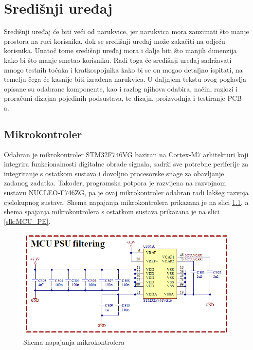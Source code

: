 \chapter{Središnji uređaj}
\label{pog:mainboard}

Središnji uređaj će biti veći od narukvice, jer narukvica mora zauzimati što manje prostora na ruci korisnika, dok se središnji uređaj može zakačiti na odjeću korisnika. Unatoč tome središnji uređaj mora i dalje biti što manjih dimenzija kako bi što manje smetao korisniku. Radi toga će središnji uređaj sadržavati mnogo testnih točaka i kratkospojnika kako bi se on mogao detaljno ispitati, na temelju čega će kasnije biti izrađena narukvica. U daljnjem tekstu ovog poglavlja opisane su odabrane komponente, kao i razlog njihova odabira, način, razlozi i proračuni dizajna pojedinih podsustava, te dizajn, proizvodnja i testiranje PCB-a.

\section{Mikrokontroler}
Odabran je mikrokontroler STM32F746VG baziran na Cortex-M7 arhitekturi koji integrira funkcionalnosti digitalne obrade signala, sadrži sve potrebne periferije za integriranje s ostatkom sustava i dovoljno procesorske snage za obavljanje zadanog zadatka. Također, programska potpora je razvijena na razvojnom sustavu NUCLEO-F746ZG, pa je ovaj mikrokontroler odabran radi lakšeg razvoja cjelokupnog sustava. Shema napajanja mikrokontrolera prikazana je na slici \ref{slk:MCU_PS}, a shema spajanja mikrokontrolera s ostatkom sustava prikazana je na slici \ref{slk:MCU_PE}.
\begin{figure}[!htb]
    \centering
    \includegraphics[width=10 cm]{Figures/MCU_02.png}
    \caption{Shema napajanja mikrokontrolera}
    \label{slk:MCU_PS}
\end{figure}

